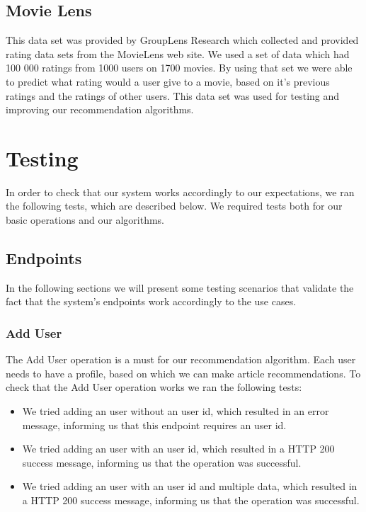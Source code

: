 \subsection{Movie Lens} 
\label{sec:testing-and-validation-data-sources-movie-lens}
This data set was provided by GroupLens Research which collected and provided rating data sets from the MovieLens web site. We used a set of data which had  100 000 ratings from 1000 users on 1700 movies.
By using that set we were able to predict what rating would a user give to a movie, based on it's previous ratings and the ratings of other users. This data set was used for testing and improving our recommendation algorithms.

\section{Testing} 
\label{sec:testing-and-validation-testing}
In order to check that our system works accordingly to our expectations, we ran the following tests, which are described below.
We required tests both for our basic operations and our algorithms.

\subsection{Endpoints} 
\label{sec:basic-operations}
In the following sections we will present some testing scenarios that validate the fact that the system's endpoints work accordingly to the use cases.

\subsubsection{Add User}
\label{sec:basic-operations-add-user}
The Add User operation is a must for our recommendation algorithm. Each user needs to have  a profile, based on which we can make article recommendations. To check that the Add User operation works we ran the following tests: 
\begin{itemize}
	\item We tried adding an user without an user id, which resulted in an error message, informing us that this endpoint requires an user id.
	\item We tried adding an user with an user id, which resulted in a HTTP 200 success message, informing us that the operation was successful.
	\item We tried adding an user with an user id and multiple data, which resulted in a HTTP 200 success message, informing us that the operation was successful.
\end{itemize}

